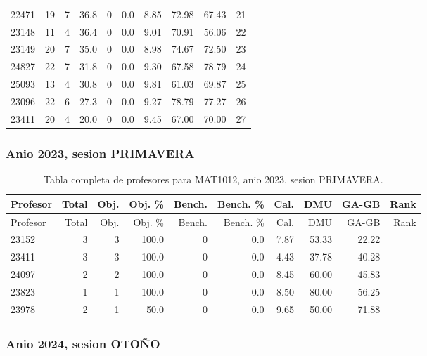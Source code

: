 \begin{longtable}{lrrrrrrrrr}
22471 & 19 & 7 & 36.8 & 0 & 0.0 & 8.85 & 72.98 & 67.43 & 21 \\
23148 & 11 & 4 & 36.4 & 0 & 0.0 & 9.01 & 70.91 & 56.06 & 22 \\
23149 & 20 & 7 & 35.0 & 0 & 0.0 & 8.98 & 74.67 & 72.50 & 23 \\
24827 & 22 & 7 & 31.8 & 0 & 0.0 & 9.30 & 67.58 & 78.79 & 24 \\
25093 & 13 & 4 & 30.8 & 0 & 0.0 & 9.81 & 61.03 & 69.87 & 25 \\
23096 & 22 & 6 & 27.3 & 0 & 0.0 & 9.27 & 78.79 & 77.27 & 26 \\
23411 & 20 & 4 & 20.0 & 0 & 0.0 & 9.45 & 67.00 & 70.00 & 27 \\
\bottomrule
\end{longtable}
\endgroup

\subsubsection{Anio 2023, sesion PRIMAVERA}

\begingroup
\scriptsize
\setlength{\tabcolsep}{3pt}
\begin{longtable}{lrrrrrrrrr}
\caption{Tabla completa de profesores para MAT1012, anio 2023, sesion PRIMAVERA.}\label{tab:prof-period-mat1012-2023-primavera-especializado}\\
\toprule
Profesor & Total & Obj. & Obj. \% & Bench. & Bench. \% & Cal. & DMU & GA-GB & Rank \\
\midrule
\endfirsthead
\toprule
Profesor & Total & Obj. & Obj. \% & Bench. & Bench. \% & Cal. & DMU & GA-GB & Rank \\
\midrule
\endhead
23152 & 3 & 3 & 100.0 & 0 & 0.0 & 7.87 & 53.33 & 22.22 &  \\
23411 & 3 & 3 & 100.0 & 0 & 0.0 & 4.43 & 37.78 & 40.28 &  \\
24097 & 2 & 2 & 100.0 & 0 & 0.0 & 8.45 & 60.00 & 45.83 &  \\
23823 & 1 & 1 & 100.0 & 0 & 0.0 & 8.50 & 80.00 & 56.25 &  \\
23978 & 2 & 1 & 50.0 & 0 & 0.0 & 9.65 & 50.00 & 71.88 &  \\
\bottomrule
\end{longtable}
\endgroup

\subsubsection{Anio 2024, sesion OTOÑO}


